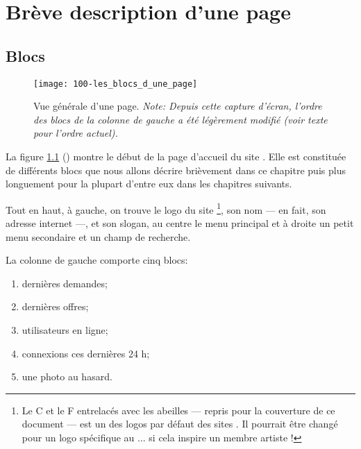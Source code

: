 \chapter{Brève description d'une page}

\section{Blocs}

\begin{figure}
    \texttt{[image: 100-les\_blocs\_d\_une\_page]}
    \caption[Vue générale d’une page]{Vue générale d’une page. \textsl{\small Note: Depuis cette capture d'écran, l'ordre des blocs de la colonne de gauche a été légèrement modifié (voir texte pour l'ordre actuel).}}
    \label{fig:vueGeneralePage}
\end{figure}

La figure \ref{fig:vueGeneralePage} () montre le début de la page d'accueil du site \CF. Elle est constituée de différents blocs que nous allons décrire brièvement dans ce chapitre puis plus longuement pour la plupart d’entre eux dans les chapitres suivants.


Tout en haut, à gauche, on trouve le logo du site%
\footnote{Le C et le F entrelacés avec les abeilles --- repris pour la couverture de ce document --- est un des logos par défaut des sites \CF. Il pourrait être changé pour un logo spécifique au \CdS{} ... si cela inspire un membre artiste !},
son nom --- en fait, son adresse internet ---, et son slogan, au centre le menu principal et à droite un petit menu secondaire et un champ de recherche.


La colonne de gauche comporte cinq blocs: 
\begin{enumerate}
    \item dernières demandes;
    \item dernières offres;
    \item utilisateurs en ligne;
    \item connexions ces dernières 24 h;
    \item une photo au hasard.
\end{enumerate}

